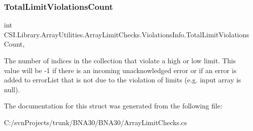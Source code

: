 \subsubsection{\texorpdfstring{TotalLimitViolationsCount}{TotalLimitViolationsCount}}
{\footnotesize\ttfamily int C\+S\+I.\+Library.\+Array\+Utilities.\+Array\+Limit\+Checks.\+Violations\+Info.\+Total\+Limit\+Violations\+Count\hspace{0.3cm}{\ttfamily [get]}, {\ttfamily [set]}}



The number of indices in the collection that violate a high or low limit. This value will be -\/1 if there is an incoming unacknowledged error or if an error is added to error\+List that is not due to the violation of limits (e.\+g. input array is null). 



The documentation for this struct was generated from the following file\+:\begin{DoxyCompactItemize}
\item 
C\+:/svn\+Projects/trunk/\+B\+N\+A30/\+B\+N\+A30/Array\+Limit\+Checks.\+cs\end{DoxyCompactItemize}
